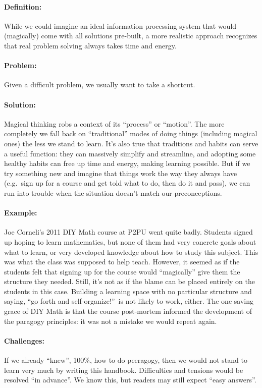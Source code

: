 \paragraph{Definition:} While we could imagine an ideal information
processing system that would (magically) come with all solutions
pre-built, a more realistic approach recognizes that real problem
solving always takes time and energy.

\paragraph{Problem:} Given a difficult problem, we usually want to take a
shortcut.

\paragraph{Solution:} Magical thinking robs a context of its ``process'' or
``motion''. The more completely we fall back on ``traditional'' modes of
doing things (including magical ones) the less we stand to learn. It's
also true that traditions and habits can serve a useful function: they
can massively simplify and streamline, and adopting some healthy habits
can free up time and energy, making learning possible. But if we try
something new and imagine that things work the way they always have
(e.g.~sign up for a course and get told what to do, then do it and
pass), we can run into trouble when the situation doesn't match our
preconceptions.

\paragraph{Example:} Joe Corneli's 2011 DIY Math course at P2PU went quite
badly. Students signed up hoping to learn mathematics, but none of them
had very concrete goals about what to learn, or very developed knowledge
about how to study this subject. This was what the class was supposed to
help teach. However, it seemed as if the students felt that signing up
for the course would ``magically'' give them the structure they needed.
Still, it's not as if the blame can be placed entirely on the students
in this case. Building a learning space with no particular structure and
saying, ``go forth and self-organize!''~is not likely to work, either.
The one saving grace of DIY Math is that the course post-mortem informed
the development of the paragogy principles: it was not a mistake we
would repeat again.

\paragraph{Challenges:} If we already ``knew'', 100\%, how to do peeragogy,
then we would not stand to learn very much by writing this handbook.
Difficulties and tensions would be resolved ``in advance''. We know
this, but readers may still expect ``easy answers''.

